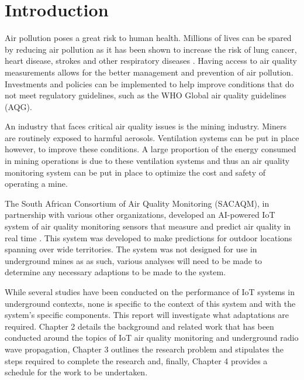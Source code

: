 \documentclass[a4paper,twoside,12pt]{report}
\begin{document}
\tableofcontents
\newpage
{}
{}
\listoffigures
\newpage
{}
{}
\listoftables
\newpage
{}

\chapter{Introduction}
Air pollution poses a great risk to human health. Millions of lives can be spared by reducing air pollution as it has been shown to increase the risk of lung cancer, heart disease, strokes and other respiratory diseases \citep{WHO_2022}. Having access to air quality measurements allows for the better management and prevention of air pollution. Investments and policies can be implemented to help improve conditions that do not meet regulatory guidelines, such as the WHO Global air quality guidelines (AQG).
\newline

An industry that faces critical air quality issues is the mining industry. Miners are routinely exposed to harmful aerosols. Ventilation systems can be put in place however, to improve these conditions. A large proportion of the energy consumed in mining operations is due to these ventilation systems and thus an air quality monitoring system can be put in place to optimize the cost and safety of operating a mine\citep{Hercus_2022}.
\newline

The South African Consortium of Air Quality Monitoring (SACAQM), in partnership with various other organizations, developed an AI-powered IoT system of air quality monitoring sensors that measure and predict air quality in real time \citep{SACAQM}. This system was developed to make predictions for outdoor locations spanning over wide territories. The system was not designed for use in underground mines as as such, various analyses will need to be made to determine any necessary adaptions to be made to the system.
\newline

While several studies have been conducted on the performance of IoT systems in underground contexts, none is specific to the context of this system and with the system's specific components. This report will investigate what adaptations are required. Chapter 2 details the background and related work that has been conducted around the topics of IoT air quality monitoring and underground radio wave propagation, Chapter 3 outlines the research problem and stipulates the steps required to complete the research and, finally, Chapter 4 provides a schedule for the work to be undertaken.
\end{document}
